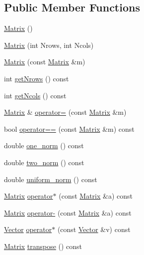 \subsection*{Public Member Functions}
\begin{DoxyCompactItemize}
\item 
\mbox{\hyperlink{classMatrix_a2dba13c45127354c9f75ef576f49269b}{Matrix}} ()
\item 
\mbox{\hyperlink{classMatrix_a135a15de1126d735bb95fcc839d739d7}{Matrix}} (int Nrows, int Ncols)
\item 
\mbox{\hyperlink{classMatrix_a765f4dcb51b6829311cc3e7576388423}{Matrix}} (const \mbox{\hyperlink{classMatrix}{Matrix}} \&m)
\item 
int \mbox{\hyperlink{classMatrix_a711f84a1c62832d9d197d78c9855a276}{get\+Nrows}} () const
\item 
int \mbox{\hyperlink{classMatrix_ae0a5f2154953b8d129a90b04f91d9079}{get\+Ncols}} () const
\item 
\mbox{\hyperlink{classMatrix}{Matrix}} \& \mbox{\hyperlink{classMatrix_aea5a06385f646eb4a63929fae6fa3e14}{operator=}} (const \mbox{\hyperlink{classMatrix}{Matrix}} \&m)
\item 
bool \mbox{\hyperlink{classMatrix_a35097c20bcb1495b57d452db0d7b1f53}{operator==}} (const \mbox{\hyperlink{classMatrix}{Matrix}} \&m) const
\item 
double \mbox{\hyperlink{classMatrix_af4d468252f3ecbbcaa5726c76e332b4c}{one\+\_\+norm}} () const
\item 
double \mbox{\hyperlink{classMatrix_aac496af05ec7aa26afc2b9c6d0ab8b66}{two\+\_\+norm}} () const
\item 
double \mbox{\hyperlink{classMatrix_a43066c7fe6418aad40170b85415063e8}{uniform\+\_\+norm}} () const
\item 
\mbox{\hyperlink{classMatrix}{Matrix}} \mbox{\hyperlink{classMatrix_aaa40c78e6b3bb5bbf572d35612dbf6a7}{operator$\ast$}} (const \mbox{\hyperlink{classMatrix}{Matrix}} \&a) const
\item 
\mbox{\hyperlink{classMatrix}{Matrix}} \mbox{\hyperlink{classMatrix_a5f08ceb21dd13e2afa6c68afc73db1d3}{operator-\/}} (const \mbox{\hyperlink{classMatrix}{Matrix}} \&a) const
\item 
\mbox{\hyperlink{classVector}{Vector}} \mbox{\hyperlink{classMatrix_a843eebe2b6bd9d8091be600f685252cb}{operator$\ast$}} (const \mbox{\hyperlink{classVector}{Vector}} \&v) const
\item 
\mbox{\hyperlink{classMatrix}{Matrix}} \mbox{\hyperlink{classMatrix_a759661b75b9681f3a89ff75e27933b3a}{transpose}} () const
\end{DoxyCompactItemize}
